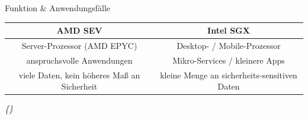 \documentclass{sdqbeamer}
\begin{document}
\begin{frame}{Funktion \& Anwendungsfälle}

	\begin{tabular}[h]{c|c}
		\color{kitgreen} AMD SEV & \color{kitgreen}Intel SGX \\
		\hline
		Server-Prozessor (AMD EPYC) & Desktop- / Mobile-Prozessor \\
		anspruchsvolle Anwendungen & Mikro-Services / kleinere Apps \\
		viele Daten, kein höheres Maß an Sicherheit & kleine Menge an sicherheits-sensitiven Daten \\
		
	\end{tabular}

	\vfill
	\small\textit{\{\cite{mofrad}\}}
\end{frame}
\end{document}
